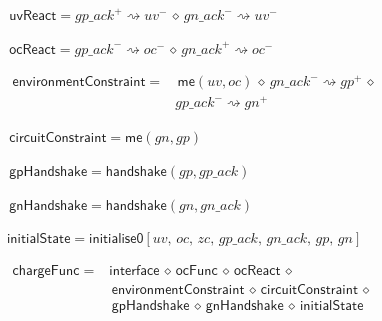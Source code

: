 \documentclass[british,compsoc]{IEEEtran}
\begin{document}
\begin{minipage}[h]{1\columnwidth}
\begin{flushleft}
$\,\mathsf{uvReact}=gp\_ack^{+}\rightsquigarrow uv^{-}\,\diamond\, gn\_ack^{-}\rightsquigarrow uv^{-}$
\par\end{flushleft}

\begin{flushleft}
$\,\mathsf{ocReact}=gp\_ack^{-}\rightsquigarrow oc^{-}\,\diamond\, gn\_ack^{+}\rightsquigarrow oc^{-}$
\par\end{flushleft}

\begin{flushleft}
$\begin{aligned}\mathsf{environmentConstraint}=&\,\mathsf{me}(uv, oc) \,\diamond\, gn\_ack^{-}\rightsquigarrow gp^{+}\,\diamond\,\\
& gp\_ack^{-}\rightsquigarrow gn^{+}
\end{aligned}$
\par\end{flushleft}

\begin{flushleft}
$\,\mathsf{\mathsf{circuitConstraint}}=\mathsf{me}(gn, gp)$
\par\end{flushleft}

\begin{flushleft}
$\,\mathsf{gpHandshake}=\mathsf{handshake}(gp, gp\_ack)$
\par\end{flushleft}

\begin{flushleft}
$\,\mathsf{gnHandshake}=\mathsf{handshake}(gn, gn\_ack)$
\par\end{flushleft}

\begin{flushleft}
$\mathsf{initialState}=\mathsf{initialise0}[uv,\, oc,\, zc,\, gp\_ack,\, gn\_ack,\, gp,\, gn]$
\par\end{flushleft}

\begin{flushleft}
$\begin{aligned}\mathsf{chargeFunc}= & \mathsf{interface}\,\diamond\,\mathsf{ocFunc}\,\diamond\,\mathsf{ocReact}\,\diamond\\
 & \mathsf{\mathsf{\, environmentConstraint}\,\diamond\, circuitConstraint}\,\diamond\,\\
 & \mathsf{\, gpHandshake}\,\diamond\,\mathsf{gnHandshake}\,\diamond\,\mathsf{initialState}
\end{aligned}
$
\par\end{flushleft}


\end{minipage}
\end{document}
